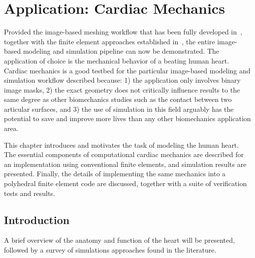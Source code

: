 \chapter{Application: Cardiac Mechanics}
\label{chap:5}
%
Provided the image-based meshing workflow that has been fully developed in~, together with the finite element approaches established in~, the entire image-based modeling and simulation pipeline can now be demonstrated. The application of choice is the mechanical behavior of a beating human heart. Cardiac mechanics is a good testbed for the particular image-based modeling and simulation workflow described because: 1) the application only involves binary image masks, 2) the exact geometry does not critically influence results to the same degree as other biomechanics studies such as the contact between two articular surfaces, and 3) the use of simulation in this field arguably has the potential to save and improve more lives than any other biomechanics application area.

This chapter introduces and motivates the task of modeling the human heart. The essential components of computational cardiac mechanics are described for an implementation using conventional finite elements, and simulation results are presented. Finally, the details of implementing the same mechanics into a polyhedral finite element code are discussed, together with a suite of verification tests and results.

\section{Introduction}

A brief overview of the anatomy and function of the heart will be presented, followed by a survey of simulations approaches found in the literature.

